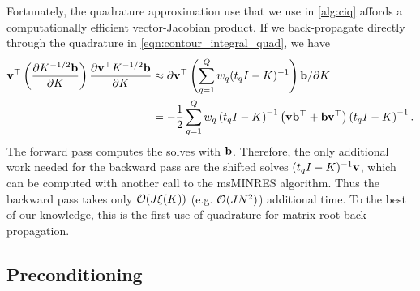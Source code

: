 Fortunately, the quadrature approximation use that we use in \cref{alg:ciq} affords a computationally efficient vector-Jacobian product.
If we back-propagate directly through the quadrature in \cref{eqn:contour_integral_quad}, we have
%
\begin{align}
  \mathbf{v}^\top \left( \frac{ \partial K^{-1/2} \mathbf{b} }{ \partial K } \right)
   \frac{ \partial \mathbf{v}^\top K^{-1/2} \mathbf{b} }{ \partial K }
  &\approx { \partial \ensuremath{\mathbf{v}}^\top \left( \sum_{q=1}^{Q} w_q (t_q \ensuremath{I}- \ensuremath{K})^{-1} \right) \ensuremath{\mathbf{b}}}/{ \partial K }
  \nonumber
  \\
  &= - \frac{1}{2} \sum_{q=1}^{Q} w_q
  \left( t_q I - K \right)^{-1}
  \left( \mathbf{v} \mathbf{b}^\top + \mathbf{b} \mathbf{v}^\top \right)
  \left( t_q I - K \right)^{-1}.
  \label{eqn:ciq_deriv}
\end{align}
%
The forward pass computes the solves with $\mathbf{b}$.
Therefore, the only additional work needed for the backward pass are the shifted solves $(t_q I - K)^{-1} \mathbf{v}$, which can be computed with another call to the msMINRES algorithm.
Thus the backward pass takes only $\bigo{J \mvm{\bK}}$ (e.g. $\bigo{J N^2}$) additional time.
To the best of our knowledge, this is the first use of quadrature for matrix-root back-propagation.



\subsection{Preconditioning}
\label{sec:ciq_precond}


